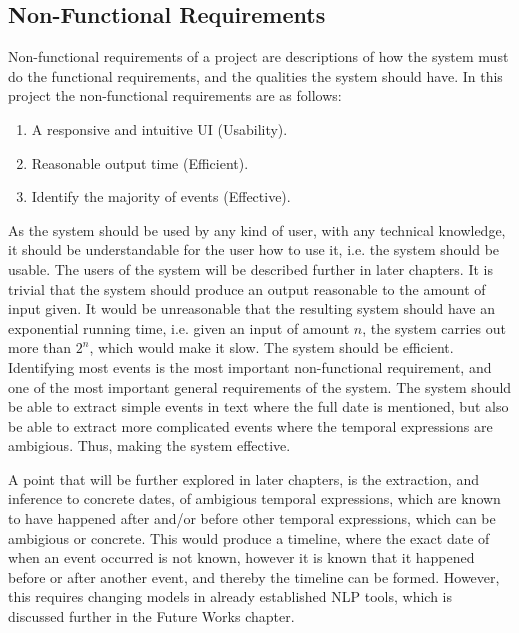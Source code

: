 \subsection{Non-Functional Requirements}
\par Non-functional requirements of a project are descriptions of how the system must do the functional requirements, and the qualities the system should have. In this project the non-functional requirements are as follows:
\begin{enumerate}
\item A responsive and intuitive UI (Usability).
\item Reasonable output time (Efficient).
\item Identify the majority of events (Effective).
\end{enumerate}
\par As the system should be used by any kind of user, with any technical knowledge, it should be understandable for the user how to use it, i.e. the system should be usable. The users of the system will be described further in later chapters. It is trivial that the system should produce an output reasonable to the amount of input given. It would be unreasonable that the resulting system should have an exponential running time, i.e. given an input of amount $n$, the system carries out more than $2^n$, which would make it slow. The system should be efficient. Identifying most events is the most important non-functional requirement, and one of the most important general requirements of the system. The system should be able to extract simple events in text where the full date is mentioned, but also be able to extract more complicated events where the temporal expressions are ambigious. Thus, making the system effective.
\par A point that will be further explored in later chapters, is the extraction, and inference to concrete dates, of ambigious temporal expressions, which are known to have happened after and/or before other temporal expressions, which can be ambigious or concrete. This would produce a timeline, where the exact date of when an event occurred is not known, however it is known that it happened before or after another event, and thereby the timeline can be formed. However, this requires changing models in already established NLP tools, which is discussed further in the Future Works chapter.

